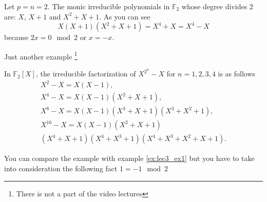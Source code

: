 \begin{example}
  Let $p = n = 2$. The monic irreducible polynomials in $\mathbb{F}_2$
  whose degree divides $2$ are: $X$, $X+1$ and $X^2 +X + 1$.
  As you can see
  \begin{equation}
    X\left(X+1\right)\left(X^2+X+1\right) = X^4 + X = X^4 - X
    \nonumber
  \end{equation}
  because $2x = 0 \mod 2$ or $x = -x$.
  \label{ex:lec3_ex1}
\end{example}

Just another example \cite{bib:KeithConradFiniteFields}
\footnote{
  There is not a part of the video lectures
}
\begin{example}
  In $\mathbb{F}_2\left[X\right]$, the irreducible factorization of
  $X^{2^n} -X$ for $n=1,2,3,4$ is as follows
  \begin{eqnarray}
    X^2 -X = X \left(X-1\right),
    \nonumber \\
    X^4 -X = X \left(X-1\right)\left(X^2 + X + 1\right),
    \nonumber \\
    X^8 -X = X \left(X-1\right)\left(X^3 + X + 1\right)
    \left(X^3 + X^2 + 1\right),
    \nonumber \\
    X^{16} -X = X \left(X-1\right)\left(X^2 + X + 1\right)
    \nonumber \\
    \left(X^4 + X + 1\right)\left(X^4 + X^3 + 1\right)
    \left(X^4 + X^3 + X^2 + X + 1\right).
    \nonumber
  \end{eqnarray}

  You can compare the example with example \ref{ex:lec3_ex1} but you
  have to take into consideration the following fact
  $1 = -1 \mod 2$
\end{example}


